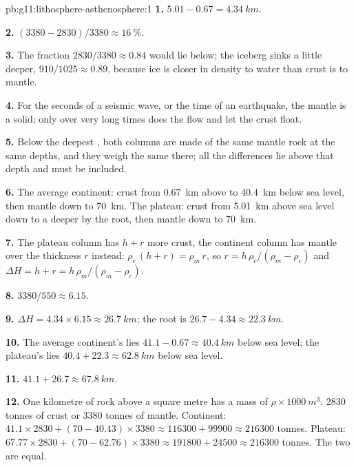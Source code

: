 \begin{solution}{pb:g11:lithosphere-asthenosphere:1}
\textbf{1.} $5.01 - 0.67 = \qty{4.34}{km}$.

\textbf{2.} $(3380 - 2830)/3380 \approx \qty{16}{\percent}$.

\textbf{3.} The fraction $2830/3380 \approx 0.84$ would lie below; the
iceberg sinks a little deeper, $910/1025 \approx 0.89$, because ice is
closer in density to water than crust is to mantle.

\textbf{4.} For the seconds of a seismic wave, or the time of an
earthquake, the mantle is a solid; only over very long times does the
 flow and let the crust float.

\textbf{5.} Below the deepest , both columns are made of the same mantle
rock at the same depths, and they weigh the same there; all the differences
lie above that depth and must be included.

\textbf{6.} The average continent: crust from \qty{0.67}{km} above to
\qty{40.4}{km} below sea level, then mantle down to \qty{70}{km}. The
plateau: crust from \qty{5.01}{km} above sea level down to a  deeper by
the root, then mantle down to \qty{70}{km}.

\textbf{7.} The plateau column has $h + r$ more crust, the continent column
has mantle over the thickness $r$ instead: $\rho_c\,(h + r) = \rho_m\,r$,
so $r = h\,\rho_c/(\rho_m - \rho_c)$ and $\Delta H = h + r =
h\,\rho_m/(\rho_m - \rho_c)$.

\textbf{8.} $3380/550 \approx 6.15$.

\textbf{9.} $\Delta H = 4.34 \times 6.15 \approx \qty{26.7}{km}$; the root is
$26.7 - 4.34 \approx \qty{22.3}{km}$.

\textbf{10.} The average continent's  lies $41.1 - 0.67 \approx
\qty{40.4}{km}$ below sea level; the plateau's lies $40.4 + 22.3 \approx
\qty{62.8}{km}$ below sea level.

\textbf{11.} $41.1 + 26.7 \approx \qty{67.8}{km}$.

\textbf{12.} One kilometre of rock above a square metre has a mass of
$\rho \times \qty{1000}{m^3}$: \num{2830} tonnes of crust or \num{3380}
tonnes of mantle. Continent: $41.1 \times 2830 + (70 - 40.43) \times 3380
\approx \num{116300} + \num{99900} \approx \num{216300}$ tonnes. Plateau:
$67.77 \times 2830 + (70 - 62.76) \times 3380 \approx \num{191800} +
\num{24500} \approx \num{216300}$ tonnes. The two are equal.


\end{solution}
